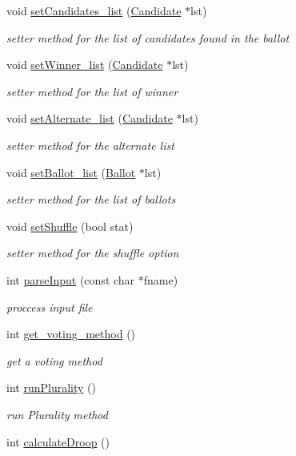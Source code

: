 \begin{DoxyCompactItemize}
void \hyperlink{classElection_aa86c7a50b7623975ab28b8d3fa9fcb16}{set\+Candidates\+\_\+list} (\hyperlink{classCandidate}{Candidate} $\ast$lst)
\begin{DoxyCompactList}\small\item\em setter method for the list of candidates found in the ballot \end{DoxyCompactList}\item 
void \hyperlink{classElection_ab466e0d577928ebbab77fed6e50a38a9}{set\+Winner\+\_\+list} (\hyperlink{classCandidate}{Candidate} $\ast$lst)
\begin{DoxyCompactList}\small\item\em setter method for the list of winner \end{DoxyCompactList}\item 
void \hyperlink{classElection_a069591e9288769dd363be62b29140843}{set\+Alternate\+\_\+list} (\hyperlink{classCandidate}{Candidate} $\ast$lst)
\begin{DoxyCompactList}\small\item\em setter method for the alternate list \end{DoxyCompactList}\item 
void \hyperlink{classElection_a8dff79efabdd45105761c4ccdee3113d}{set\+Ballot\+\_\+list} (\hyperlink{classBallot}{Ballot} $\ast$lst)
\begin{DoxyCompactList}\small\item\em setter method for the list of ballots \end{DoxyCompactList}\item 
void \hyperlink{classElection_a7940f103d39630fd12948b1ae20cd950}{set\+Shuffle} (bool stat)
\begin{DoxyCompactList}\small\item\em setter method for the shuffle option \end{DoxyCompactList}\item 
int \hyperlink{classElection_a68ffe21f4857d0f5dc014231360bde3c}{parse\+Input} (const char $\ast$fname)
\begin{DoxyCompactList}\small\item\em proccess input file \end{DoxyCompactList}\item 
int \hyperlink{classElection_a712d4680504d5e8d7b8491f7060a1e98}{get\+\_\+voting\+\_\+method} ()
\begin{DoxyCompactList}\small\item\em get a voting method \end{DoxyCompactList}\item 
int \hyperlink{classElection_a6d164108961bfa211d24e8259515bc0f}{run\+Plurality} ()
\begin{DoxyCompactList}\small\item\em run Plurality method \end{DoxyCompactList}\item 
int \hyperlink{classElection_a56e4bee7e1949b2bb25f84e74b2f7f1f}{calculate\+Droop} ()\hypertarget{classElection_a56e4bee7e1949b2bb25f84e74b2f7f1f}{}\label{classElection_a56e4bee7e1949b2bb25f84e74b2f7f1f}


\end{DoxyCompactItemize}
